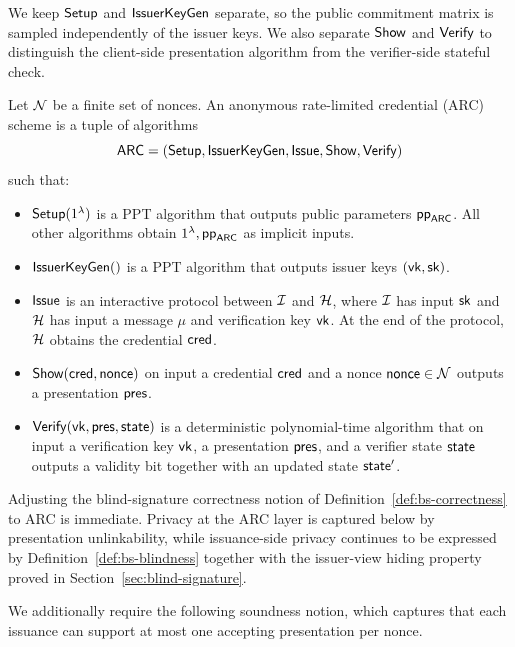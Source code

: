 We keep \(\mathsf{Setup}\) and \(\mathsf{IssuerKeyGen}\) separate, so the public commitment matrix is sampled independently of the issuer
keys. We also separate \(\mathsf{Show}\) and \(\mathsf{Verify}\) to distinguish the client-side presentation algorithm from the
verifier-side stateful check.
\begin{definition}\label{def:arc-syntax}
Let $\mathcal{N}$ be a finite set of nonces.
An anonymous rate-limited credential (ARC) scheme is a tuple of algorithms
\[
  \mathsf{ARC}=(\mathsf{Setup},\mathsf{IssuerKeyGen},\mathsf{Issue},\mathsf{Show},\mathsf{Verify})
\]
such that:

\begin{itemize}[leftmargin=1.25em]
   \item $\mathsf{Setup}(1^\lambda)$ is a PPT algorithm that outputs public parameters $\mathsf{pp}_{\mathsf{ARC}}$. All other algorithms obtain $1^\lambda,\mathsf{pp}_{\mathsf{ARC}}$ as implicit inputs.

    \item $\mathsf{IssuerKeyGen}()$ is a PPT algorithm that outputs issuer keys $(\mathsf{vk},\mathsf{sk})$.
\item $\mathsf{Issue}$ is an interactive protocol between $\mathcal{I}$ and $\mathcal{H}$, where $\mathcal{I}$ has input $\mathsf{sk}$ and $\mathcal{H}$ has input a message $\mu$ and verification key $\mathsf{vk}$. At the end of the protocol, $\mathcal{H}$ obtains the credential $\mathsf{cred}$.
  \item $\mathsf{Show}(\mathsf{cred},\mathsf{nonce})$ on input a credential $\mathsf{cred}$ and a nonce $\mathsf{nonce}\in \mathcal{N}$ outputs a presentation $\mathsf{pres}$.

  \item $\mathsf{Verify}(\mathsf{vk},\mathsf{pres},\mathsf{state})$ is a deterministic polynomial-time algorithm that on input a
  verification key $\mathsf{vk}$, a presentation $\mathsf{pres}$, and a verifier state $\mathsf{state}$ outputs a validity bit
  together with an updated state $\mathsf{state}'$.
	 \end{itemize}
\end{definition}

Adjusting the blind-signature correctness notion of Definition~\ref{def:bs-correctness} to ARC is immediate.
Privacy at the ARC layer is captured below by presentation unlinkability, while issuance-side privacy continues to be
expressed by Definition~\ref{def:bs-blindness} together with the issuer-view hiding property proved in
Section~\ref{sec:blind-signature}.


We additionally require the following soundness notion, which captures that each issuance can support at most one accepting presentation per
nonce.

